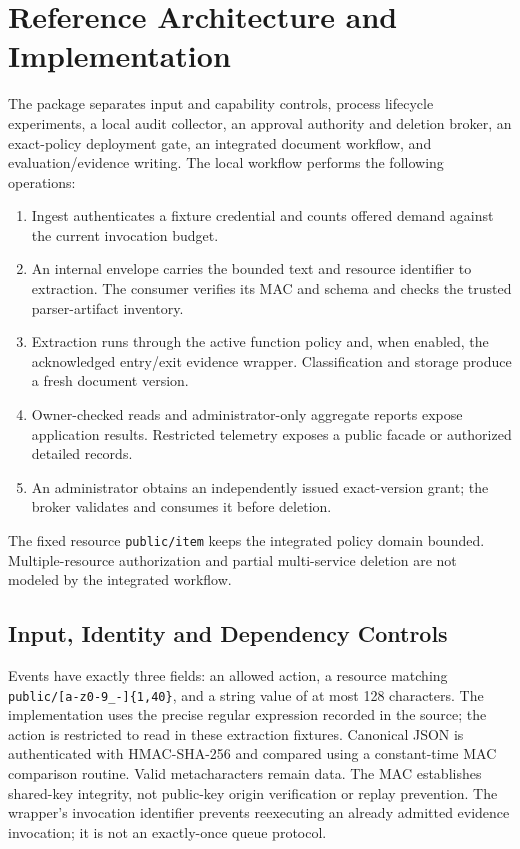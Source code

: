 \documentclass[11pt,a4paper]{article}
\begin{document}
\section{Reference Architecture and Implementation}\label{sec:implementation}
The package separates input and capability controls, process lifecycle experiments, a local audit collector, an approval authority and deletion broker, an exact-policy deployment gate, an integrated document workflow, and evaluation/evidence writing. The local workflow performs the following operations:
\begin{enumerate}
\item Ingest authenticates a fixture credential and counts offered demand against the current invocation budget.
\item An internal envelope carries the bounded text and resource identifier to extraction. The consumer verifies its MAC and schema and checks the trusted parser-artifact inventory.
\item Extraction runs through the active function policy and, when enabled, the acknowledged entry/exit evidence wrapper. Classification and storage produce a fresh document version.
\item Owner-checked reads and administrator-only aggregate reports expose application results. Restricted telemetry exposes a public facade or authorized detailed records.
\item An administrator obtains an independently issued exact-version grant; the broker validates and consumes it before deletion.
\end{enumerate}
The fixed resource \texttt{public/item} keeps the integrated policy domain bounded. Multiple-resource authorization and partial multi-service deletion are not modeled by the integrated workflow.

\subsection{Input, Identity and Dependency Controls}
Events have exactly three fields: an allowed action, a resource matching \verb|public/[a-z0-9_-]{1,40}|, and a string value of at most 128 characters. The implementation uses the precise regular expression recorded in the source; the action is restricted to read in these extraction fixtures. Canonical JSON is authenticated with HMAC-SHA-256 and compared using a constant-time MAC comparison routine. Valid metacharacters remain data. The MAC establishes shared-key integrity, not public-key origin verification or replay prevention. The wrapper's invocation identifier prevents reexecuting an already admitted evidence invocation; it is not an exactly-once queue protocol.
\end{document}

